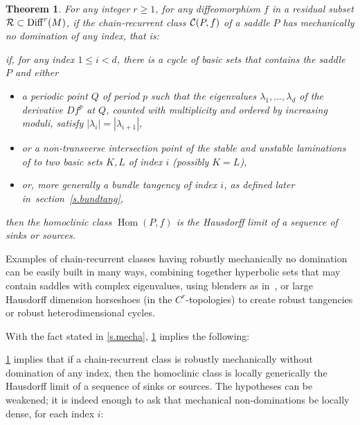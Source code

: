\documentclass[11pt, a4paper]{amsart}
\theoremstyle{plain}
\newtheorem{theorem}{Theorem} %
\theoremstyle{definition}
\theoremstyle{remark}
\numberwithin{equation}{section}         %
\DeclareMathOperator{\Diff}{{Diff}}
\def\Diff{\operatorname{Diff}}
\def\Hom{\operatorname{Hom}}
\begin{document}
\begin{theorem}\label{t.comprehensible}
For any integer $r\geq 1$, for any diffeomorphism $f$ in a residual subset $\cR \subset \Diff^r(M)$, 
if the chain-recurrent class ${\mathcal C}(P,f)$ of a saddle $P$ has mechanically no domination of any index, that is:

 if, for any index $1\leq i<d$, there is a cycle of basic sets that contains the saddle $P$ and either
\begin{itemize}
\item a periodic point $Q$ of period $p$ such that the eigenvalues $\lambda_1,...,\lambda_d$ of the derivative $Df^p$ at $Q$, counted with multiplicity and ordered by increasing moduli, satisfy $|\lambda_i|=|\lambda_{i+1}|$,
\item or a non-transverse intersection point of the stable and unstable laminations of to two basic sets $K,L$ of index $i$ (possibly $K=L$),
\item or, more generally a bundle tangency of index $i$, as defined later in~section~\ref{s.bundtang},
\end{itemize}
then the homoclinic class $\Hom(P,f)$ is the Hausdorff limit of a sequence of sinks or sources.
\end{theorem}




Examples of chain-recurrent classes having robustly mechanically no domination can be easily built in many ways, combining together hyperbolic sets that may contain saddles with complex eigenvalues, using blenders as in~\cite{BD}, or large Hausdorff dimension horseshoes (in the $C^r$-topologies) to create robust tangencies or robust heterodimensional cycles. 

With the fact stated in \cref{s.mecha}, \cref{t.comprehensible} implies the following:
\medskip

\medskip

\cref{t.comprehensible} implies that if a chain-recurrent class is robustly mechanically without domination of any index, then the homoclinic class is locally generically the Hausdorff limit of a sequence of sinks or sources. The hypotheses can be weakened; it is indeed enough to ask that mechanical non-dominations be locally dense, for each index $i$:
\end{document}
